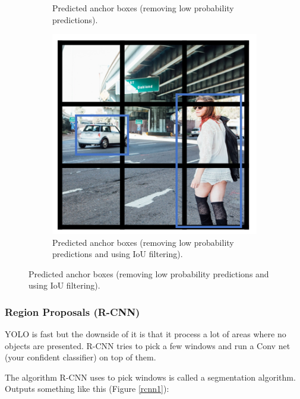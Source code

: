 \begin{figure}[!htbp]
\begin{subfigure}{.33\textwidth}
  \caption{Predicted anchor boxes (removing low probability predictions).}
  \label{yolo5}
\end{subfigure}
\begin{subfigure}{.33\textwidth}
  \centering
  \includegraphics[width=1.0\linewidth]{img/c4/yolo6.png}
  \caption{Predicted anchor boxes (removing low probability predictions and using IoU filtering).}
  \label{yolo6}
\end{subfigure}
\end{figure}

\subsubsection{Region Proposals (R-CNN)}
YOLO is fast but the downside of it is that it process a lot of areas where no objects are presented. R-CNN tries to pick a few windows and run a Conv net (your confident classifier) on top of them.

The algorithm R-CNN \cite{girshick2014rich} uses to pick windows is called a segmentation algorithm. Outputs something like this (Figure \ref{rcnn1}):

